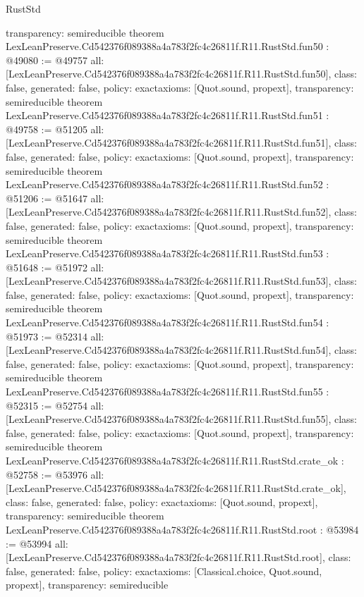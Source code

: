 \begin{lexlean}{RustStd}
\begin{coremodule}
{  transparency: semireducible
}
theorem LexLeanPreserve.Cd542376f089388a4a783f2fc4c26811f.R11.RustStd.fun50 : @49080 := @49757 {
  all: [LexLeanPreserve.Cd542376f089388a4a783f2fc4c26811f.R11.RustStd.fun50],
  class: false,
  generated: false,
  policy: exact{axioms: [Quot.sound, propext]},
  transparency: semireducible
}
theorem LexLeanPreserve.Cd542376f089388a4a783f2fc4c26811f.R11.RustStd.fun51 : @49758 := @51205 {
  all: [LexLeanPreserve.Cd542376f089388a4a783f2fc4c26811f.R11.RustStd.fun51],
  class: false,
  generated: false,
  policy: exact{axioms: [Quot.sound, propext]},
  transparency: semireducible
}
theorem LexLeanPreserve.Cd542376f089388a4a783f2fc4c26811f.R11.RustStd.fun52 : @51206 := @51647 {
  all: [LexLeanPreserve.Cd542376f089388a4a783f2fc4c26811f.R11.RustStd.fun52],
  class: false,
  generated: false,
  policy: exact{axioms: [Quot.sound, propext]},
  transparency: semireducible
}
theorem LexLeanPreserve.Cd542376f089388a4a783f2fc4c26811f.R11.RustStd.fun53 : @51648 := @51972 {
  all: [LexLeanPreserve.Cd542376f089388a4a783f2fc4c26811f.R11.RustStd.fun53],
  class: false,
  generated: false,
  policy: exact{axioms: [Quot.sound, propext]},
  transparency: semireducible
}
theorem LexLeanPreserve.Cd542376f089388a4a783f2fc4c26811f.R11.RustStd.fun54 : @51973 := @52314 {
  all: [LexLeanPreserve.Cd542376f089388a4a783f2fc4c26811f.R11.RustStd.fun54],
  class: false,
  generated: false,
  policy: exact{axioms: [Quot.sound, propext]},
  transparency: semireducible
}
theorem LexLeanPreserve.Cd542376f089388a4a783f2fc4c26811f.R11.RustStd.fun55 : @52315 := @52754 {
  all: [LexLeanPreserve.Cd542376f089388a4a783f2fc4c26811f.R11.RustStd.fun55],
  class: false,
  generated: false,
  policy: exact{axioms: [Quot.sound, propext]},
  transparency: semireducible
}
theorem LexLeanPreserve.Cd542376f089388a4a783f2fc4c26811f.R11.RustStd.crate_ok : @52758 := @53976 {
  all: [LexLeanPreserve.Cd542376f089388a4a783f2fc4c26811f.R11.RustStd.crate_ok],
  class: false,
  generated: false,
  policy: exact{axioms: [Quot.sound, propext]},
  transparency: semireducible
}
theorem LexLeanPreserve.Cd542376f089388a4a783f2fc4c26811f.R11.RustStd.root : @53984 := @53994 {
  all: [LexLeanPreserve.Cd542376f089388a4a783f2fc4c26811f.R11.RustStd.root],
  class: false,
  generated: false,
  policy: exact{axioms: [Classical.choice, Quot.sound, propext]},
  transparency: semireducible
}


\end{coremodule}
\end{lexlean}
